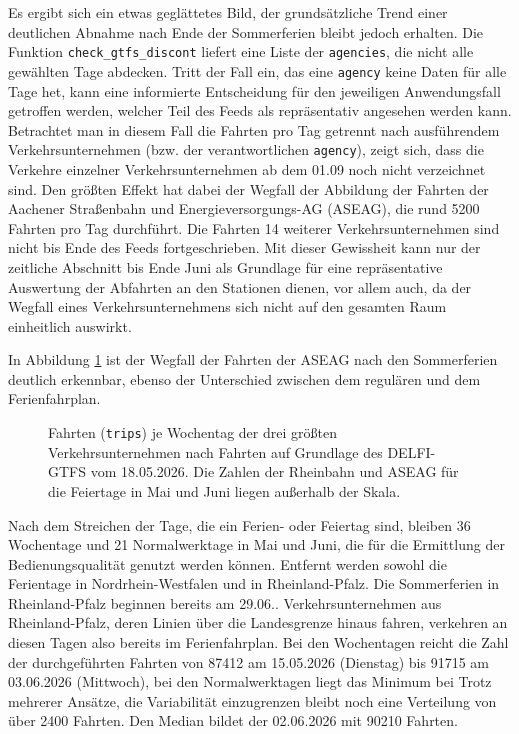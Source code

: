 \documentclass[11pt,a4paper]{scrartcl}
\begin{document}
    Es ergibt sich ein etwas geglättetes Bild, der grundsätzliche Trend einer deutlichen Abnahme nach Ende der Sommerferien bleibt jedoch erhalten. Die Funktion \texttt{check\_gtfs\_discont} liefert eine Liste der \texttt{agencies}, die nicht alle gewählten Tage abdecken. Tritt der Fall ein, das eine \texttt{agency} keine Daten für alle Tage het, kann eine informierte Entscheidung für  den jeweiligen Anwendungsfall getroffen werden, welcher Teil des Feeds als repräsentativ angesehen werden kann. Betrachtet man in diesem Fall die Fahrten pro Tag getrennt nach ausführendem Verkehrsunternehmen (bzw. der verantwortlichen \texttt{agency}), zeigt sich, dass die Verkehre einzelner Verkehrsunternehmen ab dem 01.09 noch nicht verzeichnet sind. Den größten Effekt hat dabei der Wegfall der Abbildung der Fahrten der Aachener Straßenbahn und Energieversorgungs-AG (ASEAG), die rund 5200 Fahrten pro Tag durchführt. Die Fahrten \num{14} weiterer Verkehrsunternehmen sind nicht bis Ende des Feeds fortgeschrieben. Mit dieser Gewissheit kann nur der zeitliche Abschnitt bis Ende Juni als Grundlage für eine repräsentative Auswertung der Abfahrten an den Stationen dienen, vor allem auch, da der Wegfall eines Verkehrsunternehmens sich nicht auf den gesamten Raum einheitlich auswirkt. 

    In Abbildung \ref{fig:tripsyearperagency2026-05-18} ist der Wegfall der Fahrten der ASEAG nach den Sommerferien deutlich erkennbar, ebenso der Unterschied zwischen dem regulären und dem Ferienfahrplan.
    \begin{figure}[ht]
        \centering
        \fontsize{8}{10}\selectfont
        \caption{Fahrten (\texttt{trips}) je Wochentag der drei größten Verkehrsunternehmen nach Fahrten auf Grundlage des DELFI-GTFS vom 18.05.2026. Die Zahlen  der Rheinbahn und ASEAG für die Feiertage in  Mai und Juni liegen außerhalb der Skala.}
        
        \label{fig:tripsyearperagency2026-05-18}
    \end{figure}
    Nach dem Streichen der Tage, die ein Ferien- oder Feiertag sind, bleiben 36 Wochentage und 21 Normalwerktage in Mai und Juni, die für die Ermittlung der Bedienungsqualität genutzt werden können. Entfernt werden sowohl die Ferientage in Nordrhein-Westfalen und in Rheinland-Pfalz. Die Sommerferien in Rheinland-Pfalz beginnen bereits am 29.06.. Verkehrsunternehmen aus Rheinland-Pfalz, deren Linien über die Landesgrenze hinaus fahren, verkehren an diesen Tagen also bereits im Ferienfahrplan.
    Bei den Wochentagen reicht die Zahl der durchgeführten Fahrten von  \num{87412} am 15.05.2026 (Dienstag) bis \num{91715} am 03.06.2026 (Mittwoch), bei den Normalwerktagen liegt das Minimum bei  Trotz mehrerer  Ansätze, die Variabilität einzugrenzen bleibt noch eine Verteilung von über \num{2400} Fahrten.
    Den Median bildet der 02.06.2026 mit \num{90210} Fahrten.
        
\end{document}
